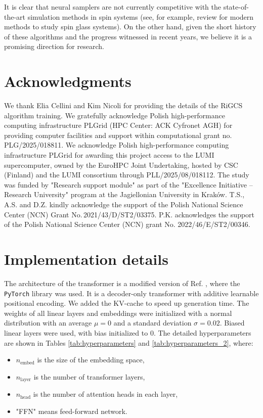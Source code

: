 \documentclass[3p, times,merge]{elsarticle}
\begin{document}
It is clear that neural samplers are not currently competitive with the state-of-the-art simulation methods in spin systems (see, for example, review \cite{ALTIERI2024361} for modern methods to study spin glass systems). On the other hand, given the short history of these algorithms and the progress witnessed in recent years, we believe it is a promising direction for research. 






\section*{Acknowledgments}
We thank Elia Cellini and Kim Nicoli for providing the details of the RiGCS algorithm training. We gratefully acknowledge Polish high-performance computing infrastructure PLGrid (HPC Center: ACK Cyfronet AGH) for providing computer facilities and support within computational grant no. PLG/2025/018811. We acknowledge Polish high-performance computing infrastructure PLGrid for awarding this project access to the LUMI supercomputer, owned by the EuroHPC Joint Undertaking, hosted by CSC (Finland) and the LUMI consortium through PLL/2025/08/018112. The study was funded by "Research support module" as part of the "Excellence Initiative -- Research University" program at the Jagiellonian University in Kraków.
T.S., A.S. and D.Z. kindly acknowledge the support of the Polish National Science Center (NCN) Grant No.\,2021/43/D/ST2/03375.  P.K. acknowledges the support of the Polish National Science Center (NCN) grant No. 2022/46/E/ST2/00346. 

\appendix

\section{Implementation details}
\label{impl_details}
The architecture of the transformer is a modified version of Ref. \cite{nanoGPT}, where the \texttt{PyTorch} library \cite{2019arXiv191201703P} was used. It is a decoder-only transformer with additive learnable positional encoding. We added the KV-cache to speed up generation time. The weights of all linear layers and embeddings were initialized with a normal distribution with an average $\mu = 0$ and a standard deviation $\sigma = 0.02$. Biased linear layers were used, with bias initialized to 0.  The detailed hyperparameters are shown in Tables \ref{tab:hyperparameters} and \ref{tab:hyperparameters_2}, where:
\begin{itemize}
    \item $n_\text{embed}$ is the size of the embedding space, 
    \item  $n_\text{layer}$ is the number of transformer layers, 
    \item  $n_\text{head}$ is the number of attention heads in each layer,
    \item "FFN" means feed-forward network.
\end{itemize}
\end{document}
